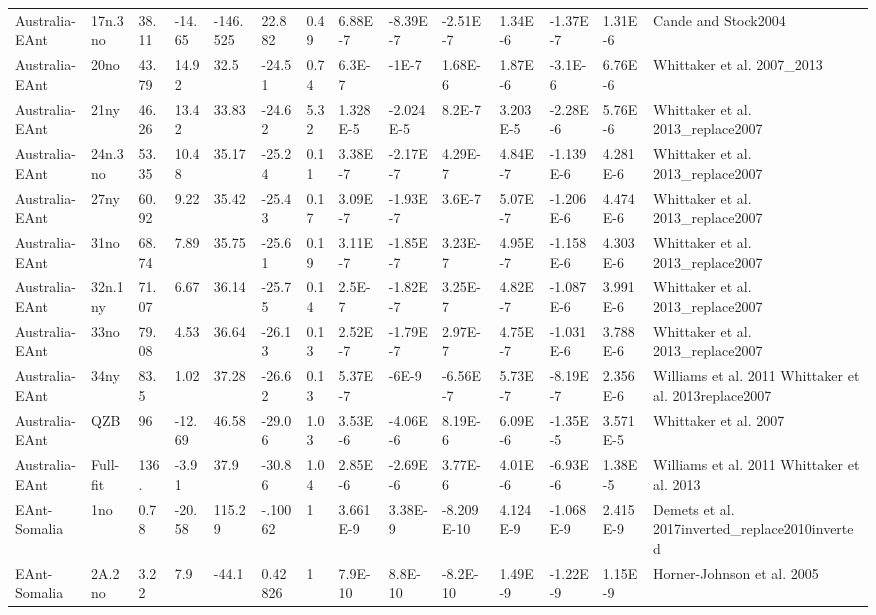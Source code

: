 \begin{landscape}
\begin{longtable}{@{}lllllllllllllp{3.5cm}@{}}
Australia-EAnt & 17n.3no & 38.11 & -14.65 & -146.525 & 22.882 & 0.49 & 6.88E-7 & -8.39E-7 & -2.51E-7 & 1.34E-6 & -1.37E-7 & 1.31E-6 & Cande and Stock2004 \\
Australia-EAnt & 20no & 43.79 & 14.92 & 32.5 & -24.51 & 0.74 & 6.3E-7 & -1E-7 & 1.68E-6 & 1.87E-6 & -3.1E-6 & 6.76E-6 & Whittaker et al. 2007\_2013 \\
Australia-EAnt & 21ny & 46.26 & 13.42 & 33.83 & -24.62 & 5.32 & 1.328E-5 & -2.024E-5 & 8.2E-7 & 3.203E-5 & -2.28E-6 & 5.76E-6 & Whittaker et al. 2013\_replace2007 \\
Australia-EAnt & 24n.3no & 53.35 & 10.48 & 35.17 & -25.24 & 0.11 & 3.38E-7 & -2.17E-7 & 4.29E-7 & 4.84E-7 & -1.139E-6 & 4.281E-6 & Whittaker et al. 2013\_replace2007 \\
Australia-EAnt & 27ny & 60.92 & 9.22 & 35.42 & -25.43 & 0.17 & 3.09E-7 & -1.93E-7 & 3.6E-7 & 5.07E-7 & -1.206E-6 & 4.474E-6 & Whittaker et al. 2013\_replace2007 \\
Australia-EAnt & 31no & 68.74 & 7.89 & 35.75 & -25.61 & 0.19 & 3.11E-7 & -1.85E-7 & 3.23E-7 & 4.95E-7 & -1.158E-6 & 4.303E-6 & Whittaker et al. 2013\_replace2007 \\
Australia-EAnt & 32n.1ny & 71.07 & 6.67 & 36.14 & -25.75 & 0.14 & 2.5E-7 & -1.82E-7 & 3.25E-7 & 4.82E-7 & -1.087E-6 & 3.991E-6 & Whittaker et al. 2013\_replace2007 \\
Australia-EAnt & 33no & 79.08 & 4.53 & 36.64 & -26.13 & 0.13 & 2.52E-7 & -1.79E-7 & 2.97E-7 & 4.75E-7 & -1.031E-6 & 3.788E-6 & Whittaker et al. 2013\_replace2007 \\
Australia-EAnt & 34ny & 83.5 & 1.02 & 37.28 & -26.62 & 0.13 & 5.37E-7 & -6E-9 & -6.56E-7 & 5.73E-7 & -8.19E-7 & 2.356E-6 & Williams et al. 2011 Whittaker et al. 2013replace2007 \\
Australia-EAnt & QZB & 96 & -12.69 & 46.58 & -29.06 & 1.03 & 3.53E-6 & -4.06E-6 & 8.19E-6 & 6.09E-6 & -1.35E-5 & 3.571E-5 & Whittaker et al. 2007 \\
Australia-EAnt & Full-fit & 136. & -3.91 & 37.9 & -30.86 & 1.04 & 2.85E-6 & -2.69E-6 & 3.77E-6 & 4.01E-6 & -6.93E-6 & 1.38E-5 & Williams et al. 2011 Whittaker et al. 2013 \\
EAnt-Somalia & 1no & 0.78 & -20.58 & 115.29 & -.10062 & 1 & 3.661E-9 & 3.38E-9 & -8.209E-10 & 4.124E-9 & -1.068E-9 & 2.415E-9 & Demets et al. 2017inverted\_replace2010inverted \\
EAnt-Somalia & 2A.2no & 3.22 & 7.9 & -44.1 & 0.42826 & 1 & 7.9E-10 & 8.8E-10 & -8.2E-10 & 1.49E-9 & -1.22E-9 & 1.15E-9 & Horner-Johnson et al. 2005 \\

\end{longtable}
\end{landscape}

